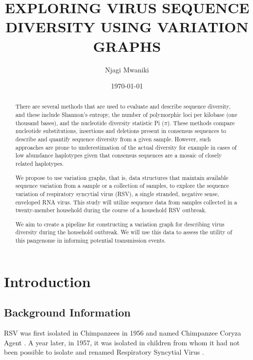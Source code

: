 \documentclass[a4paper]{article}
\author{Njagi Mwaniki}
\date{\today}
\title{EXPLORING VIRUS SEQUENCE DIVERSITY USING VARIATION GRAPHS}
\begin{document}
\maketitle
\newcommand{\bigO}{\mathcal{O}}

\newpage
\fontmatter
\newpage
\begin{abstract}
There are several methods that are used to evaluate and describe sequence
diversity, and these include Shannon's entropy, the number of polymorphic loci
per kilobase (one thousand bases), and the nucleotide diversity statistic Pi
($\pi$).
These methods compare nucleotide substitutions, insertions and deletions
present  in consensus sequences to describe and quantify sequence diversity
from a given sample.
However, such approaches are prone to underestimation of the actual
diversity for example in cases of low abundance haplotypes given that consensus
sequences are a mosaic of closely related haplotypes.

We propose to use variation graphs, that is, data structures that maintain
available sequence variation from a sample or a collection of samples, to
explore the sequence variation of respiratory syncytial virus (RSV), a single
stranded, negative sense, enveloped RNA virus. This study will utilize sequence
data from samples collected in a twenty-member household during the course of a
household RSV outbreak.

We aim to create a pipeline for constructing a variation graph for describing
virus diversity during the household outbreak. We will use this data to assess
the utility of this pangenome in informing potential transmission events.
\end{abstract}

\newpage
\tableofcontents

\listoffigures

\newpage
\mainmatter
\section{Introduction}
\label{sec:orgf369d82}
\subsection{Background Information}
\label{sec:org164c9d9}

RSV was first isolated in Chimpanzees in 1956 and named Chimpanzee Coryza Agent
\cite{morrisRecoveryCytopathogenicAgent1956}. 
A year later, in 1957, it was isolated in children from
whom it had not been possible to isolate and renamed Respiratory Syncytial
Virus \cite{beemAssociationChimpanzeeCoryza1960,chanockRecoveryInfantsRespiratory1957,zlatevaGeneticVariabilityMolecular2005}.
\end{document}
